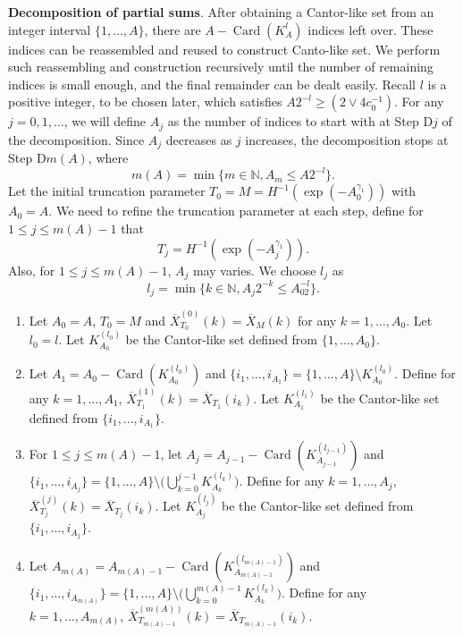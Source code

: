 \documentclass[11pt]{article}
\DeclareMathOperator*{\card}{Card}
\theoremstyle{plain}
\theoremstyle{definition}
\begin{document}
\textbf{Decomposition of partial sums}. 
After obtaining a Cantor-like set from an integer interval $\{1, \dots, A\}$, there are $A - \card(K_A^{l})$ indices left over. These indices can be reassembled and reused to construct Canto-like set. We perform such reassembling and construction recursively until the number of remaining indices is small enough, and the final remainder can be dealt easily. Recall $l$ is a positive integer, to be chosen later, which satisfies $A2^{-l} \geq (2 \vee 4c_0^{-1})$. For any $j = 0, 1, \dots$, we will define $A_j$ as the number of indices to start with at Step D$j$ of the decomposition. Since $A_j$ decreases as $j$ increases, the decomposition stops at Step D$m(A)$, where 
\begin{equation}\label{eq:def_m(A)}
    m(A) = \min\{m \in \mathbb{N}, A_m \leq A2^{-l}\}.
\end{equation}
Let the initial truncation parameter $T_0 = M = H^{-1}(\exp(-A_0^{\gamma_1}))$ with $A_0 = A$. We need to refine the truncation parameter at each step, define for $1 \leq j \leq m(A)-1$ that
\begin{equation}\label{eq:Tj}
    T_j = H^{-1}(\exp(-A_j^{\gamma_1})).
\end{equation}
Also, for $1 \leq j \leq m(A)-1$, $A_j$ may varies. We choose $l_j$ as
\begin{equation*}
    l_j = \min\{k \in \mathbb{N}, A_j2^{-k} \leq A_02^{-l}\}.
\end{equation*}
\begin{enumerate}
    \item[Step D$0$] Let $A_0 = A$, $T_0 = M$ and $\overline{X}_{T_0}^{(0)}(k) = \overline{X}_M(k)$ for any $k = 1, \dots, A_0$. Let $l_0 = l$. Let $K_{A_0}^{(l_0)}$ be the Cantor-like set defined from $\{1, \dots, A_0\}$.
    \item[Step D$1$] Let $A_1 = A_0 - \card(K_{A_0}^{(l_0)})$ and $\{i_1, \dots, i_{A_1}\} = \{1, \dots, A\} \setminus K_{A_0}^{(l_0)}$. Define for any $k = 1, \dots, A_1$, $\overline{X}_{T_1}^{(1)}(k) = \overline{X}_{T_1}(i_k)$. Let $K_{A_1}^{(l_1)}$ be the Cantor-like set defined from $\{i_1, \dots, i_{A_1}\}$.
    \item[Step D$j$] For $1 \leq j \leq m(A)-1$, let $A_j = A_{j-1} - \card(K_{A_{j-1}}^{(l_{j-1})})$ and $\{i_1, \dots, i_{A_j}\} = \{1, \dots, A\} \setminus \big(\bigcup_{k = 0}^{j-1} K_{A_{k}}^{(l_{k})}\big)$. Define for any $k = 1, \dots, A_j$, $\overline{X}_{T_j}^{(j)}(k) = \overline{X}_{T_j}(i_k)$. Let $K_{A_j}^{(l_j)}$ be the Cantor-like set defined from $\{i_1, \dots, i_{A_j}\}$.
    \item[Step D$m(A)$] Let $A_{m(A)} = A_{m(A)-1} - \card(K_{A_{m(A)-1}}^{(l_{m(A)-1})})$ and $\{i_1, \dots, i_{A_{m(A)}}\} = \{1, \dots, A\} \setminus \big(\bigcup_{k = 0}^{m(A)-1} K_{A_{k}}^{(l_{k})}\big)$. Define for any $k = 1, \dots, A_{m(A)}$, $\overline{X}_{T_{m(A)-1}}^{(m(A))}(k) = \overline{X}_{T_{m(A)-1}}(i_k)$.
\end{enumerate}
\end{document}
